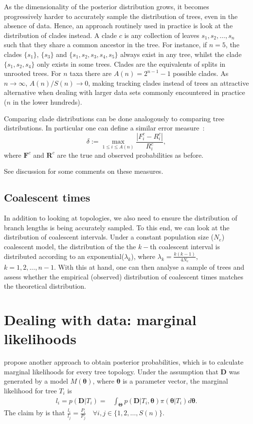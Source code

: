 As the dimensionality of the posterior distribution grows, it becomes progressively harder to accurately sample the distribution of trees, even in the absence of data.
Hence, an approach routinely used in practice is look at the distribution of clades instead.
A clade $c$ is any collection of leaves $s_1, s_2, \ldots, s_n$ such that they share a common ancestor in the tree.
For instance, if $n = 5$, the clades $\{s_1\}$, $\{s_3\}$ and $\{s_1, s_2, s_3, s_4, s_5\}$ always exist in any tree, whilst the clade $\{s_1, s_2, s_4\}$ only exists in some trees.
Clades are the equivalents of splits in unrooted trees.
For $n$ taxa there are $A(n) = 2^{n-1} -1$ possible clades. 
As $n \rightarrow \infty$, $A(n)/S(n) \rightarrow 0$, making tracking clades instead of trees an attractive alternative when dealing with larger data sets commonly encountered in practice ($n$ in the lower hundreds).

Comparing clade distributions can be done analogously to comparing tree distributions.
In particular one can define a similar error measure~\citep{Hoehna2008}:
\[ \delta := \max_{1 \leq i \leq A(n)} \frac{|F^c_i - R^c_i|}{R^c_i}, \]
where $\boldsymbol F^c$ and $\boldsymbol R^c$ are the true and observed probabilities as before.

See discussion for some comments on these measures.
\subsection*{Coalescent times}

In addition to looking at topologies, we also need to ensure the  distribution of branch lengths is being accurately sampled.
To this end, we can look at the distribution of coalescent intervals.
Under a constant population size ($N_e$) coalescent model, the distribution of the the $k-$th coalescent interval is distributed according to an exponential($\lambda_k$), where $\lambda_k = \frac{k(k-1)}{4N_e}$, $k = 1, 2, ..., n-1$.
With this at hand, one can then analyse a sample of trees and assess whether the empirical (observed) distribution of coalescent times matches the theoretical distribution.

\section*{Dealing with data: marginal likelihoods}

\cite{Hoehna2008} propose another approach to obtain posterior probabilities, which is to calculate marginal likelihoods for every tree topology.
Under the assumption that $\boldsymbol D$ was generated by a model $M(\boldsymbol \theta)$, where $\boldsymbol \theta$ is a parameter vector, the marginal likelihood for tree $T_i$ is
\begin{align}
 \label{eq:margLike}
 l_i = p(\boldsymbol D | T_i) = & \int_{\boldsymbol \Theta} p(\boldsymbol D | T_i, \boldsymbol \theta) \pi(\boldsymbol \theta | T_i)d\boldsymbol \theta. 
\end{align}
The claim by \cite{Hoehna2008} is that $\frac{l_i}{l_j} = \frac{P_i}{P_j} \quad \forall i, j \in \{1, 2, \ldots, S(n)\}$.

